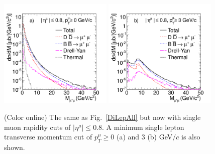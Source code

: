 \begin{figure}
\includegraphics[width=0.48\textwidth]{chap_DiMuonContinuum_figures/Fig8a_Eta1Pt0}
\includegraphics[width=0.48\textwidth]{chap_DiMuonContinuum_figures/Fig8b_Eta1Pt3}
\caption{(Color online) The same as Fig.~\protect\ref{DiLepAll} 
but now with single muon
rapidity cuts of $|\eta^\mu| \leq 0.8$.  A minimum single lepton transverse 
momentum cut of $p_T^\mu \geq 0$ (a) and 3 (b) GeV$/c$ is also shown.}
\label{DiLepCMSB}
\end{figure}


